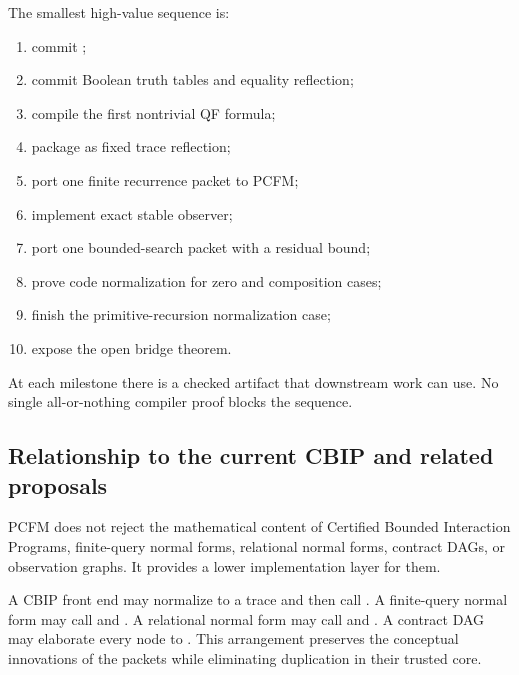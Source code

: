 The smallest high-value sequence is:

\begin{enumerate}
\item commit ;
\item commit Boolean truth tables and equality reflection;
\item compile the first nontrivial QF formula;
\item package  as fixed trace reflection;
\item port one finite recurrence packet to PCFM;
\item implement exact stable observer;
\item port one bounded-search packet with a residual bound;
\item prove code normalization for zero and composition cases;
\item finish the primitive-recursion normalization case;
\item expose the open bridge theorem.
\end{enumerate}

At each milestone there is a checked artifact that downstream work can use.
No single all-or-nothing compiler proof blocks the sequence.

\subsection{Relationship to the current CBIP and related proposals}

PCFM does not reject the mathematical content of Certified Bounded Interaction
Programs, finite-query normal forms, relational normal forms, contract DAGs,
or observation graphs.  It provides a lower implementation layer for them.

A CBIP front end may normalize to a trace and then call
.  A finite-query normal form may call
 and .  A relational normal form may call
 and .  A contract DAG may elaborate every node
to .  This arrangement preserves the conceptual innovations of
the packets while eliminating duplication in their trusted core.
